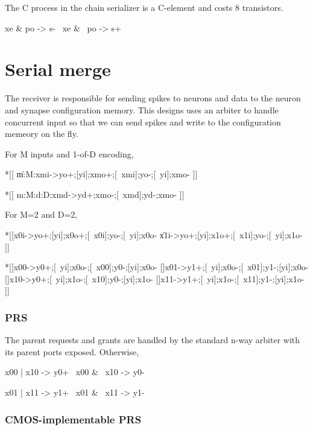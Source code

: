 \documentclass{article}
\begin{document}
The C process in the chain serializer is a C-element and costs 8 transistors.

\begin{prs2}
xe & po -> s-
~xe & ~po -> s+
\end{prs2}

\section{Serial merge \label{sec:SERIAL_MERGE}}

The receiver is responsible for sending spikes to neurons and
data to the neuron and synapse configuration memory.
This designs uses an arbiter to handle concurrent input so that we can
send spikes and write to the configuration memeory on the fly.

\noindent
For M inputs and 1-of-D encoding,

\begin{hse}
*[[
   \langle\|m:M:xmi->yo+;[yi];xmo+;[~xmi];yo-;[~yi];xmo-\rangle
 ]]

*[[
   \langle[]m:M:\langle[]d:D:xmd->yd+;xmo-;[~xmd];yd-;xmo-\rangle\rangle
 ]]
\end{hse}

\noindent
For M=2 and D=2,

\begin{hse}
*[[x0i->yo+;[yi];x0o+;[~x0i];yo-;[~yi];x0o-
  \|x1i->yo+;[yi];x1o+;[~x1i];yo-;[~yi];x1o-
 ]]

*[[x00->y0+;[~yi];x0o-;[~x00];y0-;[yi];x0o-
  []x01->y1+;[~yi];x0o-;[~x01];y1-;[yi];x0o-
  []x10->y0+;[~yi];x1o-;[~x10];y0-;[yi];x1o-
  []x11->y1+;[~yi];x1o-;[~x11];y1-;[yi];x1o-
 ]]
\end{hse}

\subsubsection*{PRS}

The parent requests and grants are handled by the standard n-way arbiter with
its parent ports exposed. Otherwise,

\begin{prs2}
x00 | x10 -> y0+
~x00 & ~x10 -> y0-

x01 | x11 -> y1+
~x01 & ~x11 -> y1-
\end{prs2}

\subsubsection*{CMOS-implementable PRS}
\end{document}

